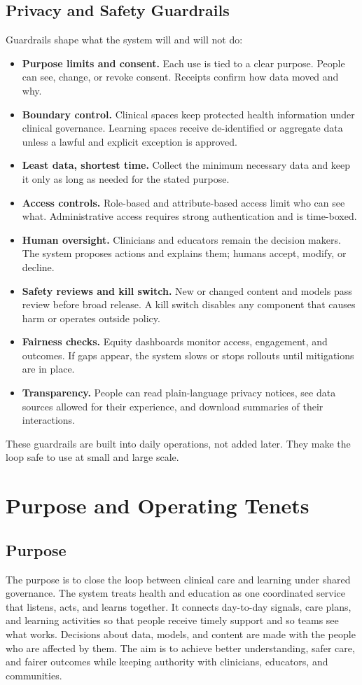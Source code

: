\documentclass[12pt]{article}
\begin{document}
\subsection*{Privacy and Safety Guardrails}
Guardrails shape what the system will and will not do:
\begin{itemize}[leftmargin=*]
  \item \textbf{Purpose limits and consent.} Each use is tied to a clear purpose. People can see, change, or revoke consent. Receipts confirm how data moved and why.
  \item \textbf{Boundary control.} Clinical spaces keep protected health information under clinical governance. Learning spaces receive de-identified or aggregate data unless a lawful and explicit exception is approved.
  \item \textbf{Least data, shortest time.} Collect the minimum necessary data and keep it only as long as needed for the stated purpose.
  \item \textbf{Access controls.} Role-based and attribute-based access limit who can see what. Administrative access requires strong authentication and is time-boxed.
  \item \textbf{Human oversight.} Clinicians and educators remain the decision makers. The system proposes actions and explains them; humans accept, modify, or decline.
  \item \textbf{Safety reviews and kill switch.} New or changed content and models pass review before broad release. A kill switch disables any component that causes harm or operates outside policy.
  \item \textbf{Fairness checks.} Equity dashboards monitor access, engagement, and outcomes. If gaps appear, the system slows or stops rollouts until mitigations are in place.
  \item \textbf{Transparency.} People can read plain-language privacy notices, see data sources allowed for their experience, and download summaries of their interactions.
\end{itemize}
These guardrails are built into daily operations, not added later. They make the loop safe to use at small and large scale.

\bigskip
\section{Purpose and Operating Tenets}

\subsection*{Purpose}
The purpose is to close the loop between clinical care and learning under shared governance. The system treats health and education as one coordinated service that listens, acts, and learns together. It connects day-to-day signals, care plans, and learning activities so that people receive timely support and so teams see what works. Decisions about data, models, and content are made with the people who are affected by them. The aim is to achieve better understanding, safer care, and fairer outcomes while keeping authority with clinicians, educators, and communities.
\end{document}
